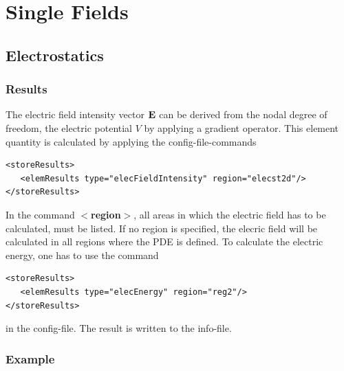 \chapter{Single Fields}

\section{Electrostatics}
\subsection{Results}
The electric field intensity vector ${\bf E}$ can be derived from the
nodal degree of freedom, the electric potential $V$ by applying a
gradient operator. This element quantity is calculated by applying
the config-file-commands

\begin{verbatim}
<storeResults>
   <elemResults type="elecFieldIntensity" region="elecst2d"/>
</storeResults>
\end{verbatim}

In the command {\bf $<$region$>$}, all areas in which the electric field has to
be calculated, must be listed. If no region  is specified, the elecric
field will be calculated in all regions where the PDE is defined. To
calculate the electric energy, one has to use the command 

\begin{verbatim}      
<storeResults>
   <elemResults type="elecEnergy" region="reg2"/>
</storeResults>
\end{verbatim}
in the config-file. The result is written to the info-file.


\subsection{Example}

